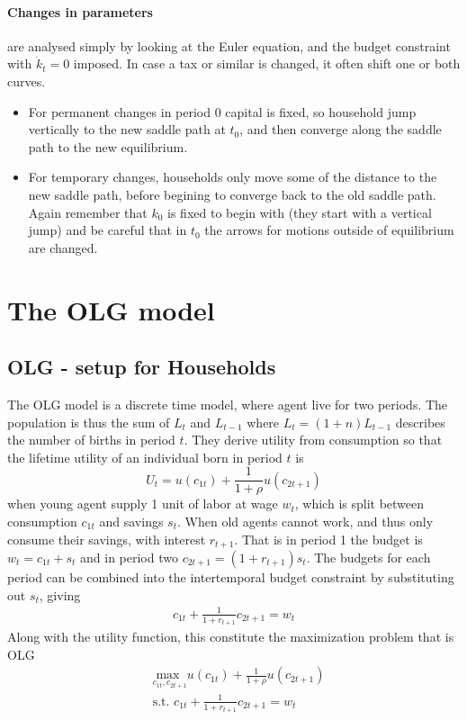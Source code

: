 \documentclass[12pt, a4paper]{article}
\begin{document}
\begin{spacing}{1.213}
\paragraph{Changes in parameters}  are analysed simply by looking at the Euler equation, and the budget constraint with $\dot{k}_t = 0$ imposed. In case a tax or similar is changed, it often shift one or both curves.
\begin{itemize}
\item For permanent changes in period $0$ capital is fixed, so household jump vertically to the new saddle path at $t_0$, and then converge along the saddle path to the new equilibrium.
\item For temporary changes, households only move some of the distance to the new saddle path, before begining to converge back to the old saddle path. Again remember that $k_0$ is fixed to begin with (they start with a vertical jump) and be careful that in $t_0$ the arrows for motions outside of equilibrium are changed.
\end{itemize}

\section{The OLG model}
\subsection{OLG - setup for Households}
The OLG model is a discrete time model, where agent live for two periods. The population is thus the sum of $L_t$ and $L_{t-1}$ where $L_t = (1+n)L_{t-1}$ describes the number of births in period $t$. They derive utility from consumption so that the lifetime utility of an individual born in period $t$ is
\begin{equation}
U_t = u(c_{1t}) + \frac{1}{1+ \rho} u(c_{2t+1})
\end{equation}
when young agent supply 1 unit of labor at wage $w_t$, which is split between consumption $c_{1t}$ and savings $s_t$. When old agents cannot work, and thus only consume their savings, with interest $r_{t+1}$. That is in period 1 the budget is $w_t = c_{1t} + s_t$ and in period two $c_{2t+1} = (1+r_{t+1})s_t$. The budgets for each period can be combined into the intertemporal budget constraint by substituting out $s_t$, giving
\begin{align}
c_{1t} + \frac{1}{1+ r_{t+1}} c_{2t+1} = w_t
\end{align}
Along with the utility function, this constitute the maximization problem that is OLG
\begin{align*}
& \underset{c_{1t},c_{2t+1}}{\textrm{max }} u(c_{1t}) + \frac{1}{1+ \rho} u(c_{2t+1}) \\
& \textrm{s.t. } c_{1t} + \frac{1}{1+ r_{t+1}} c_{2t+1} = w_t
\end{align*}


\end{spacing}
\end{document}
